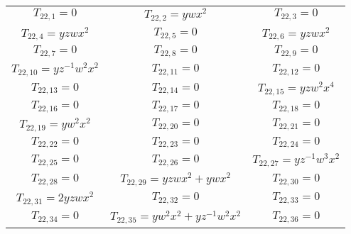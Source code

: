 \documentclass[12pt]{memoireuqam1.3}
\begin{document}
\begin{longtable}{|c|c|c|}
$T_{22,1}= 0$&

$T_{22,2}= ywx^2$&

$T_{22,3}= 0$\\

$T_{22,4}= yzwx^2$&

$T_{22,5}= 0$&

$T_{22,6}= yzwx^2$\\

$T_{22,7}= 0$&

$T_{22,8}= 0$&

$T_{22,9}= 0$\\

$T_{22,10}= yz^{-1}w^2x^2$&

$T_{22,11}= 0$&

$T_{22,12}= 0$\\

$T_{22,13}= 0$&

$T_{22,14}= 0$&

$T_{22,15}= yzw^2x^4$\\

$T_{22,16}= 0$&

$T_{22,17}= 0$&

$T_{22,18}= 0$\\

$T_{22,19}= yw^2x^2$&

$T_{22,20}= 0$&

$T_{22,21}= 0$\\

$T_{22,22}= 0$&

$T_{22,23}= 0$&

$T_{22,24}= 0$\\

$T_{22,25}= 0$&

$T_{22,26}= 0$&

$T_{22,27}= yz^{-1}w^3x^2$\\

$T_{22,28}= 0$&

$T_{22,29}= yzwx^2+ywx^2$&

$T_{22,30}= 0$\\

$T_{22,31}= 2yzwx^2$&

$T_{22,32}= 0$&

$T_{22,33}= 0$\\

$T_{22,34}= 0$&

$T_{22,35}= yw^2x^2+yz^{-1}w^2x^2$&

$T_{22,36}= 0$\\


\end{longtable}
\end{document}
